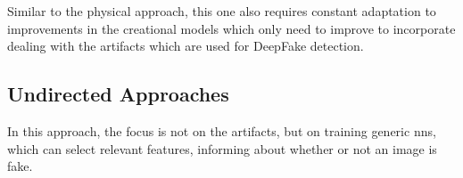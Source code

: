 \par
Similar to the physical approach, this one also requires constant adaptation to
improvements in the creational models which only need to improve to incorporate
dealing with the artifacts which are used for DeepFake detection\cite{mirsky_creation_2020}.

\subsection{Undirected Approaches}
In this approach, the focus is not on the artifacts, but on training generic
\glspl{nn}, which can select relevant features, informing about whether or not
an image is fake. 
